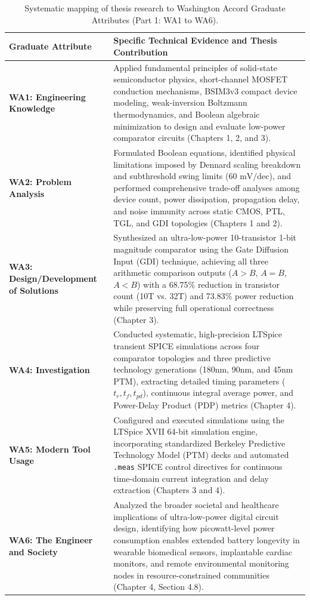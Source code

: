 \documentclass[12pt,a4paper,oneside]{report}
\begin{document}
\begin{table}[p]
\centering
\singlespacing
\small
\renewcommand{\arraystretch}{1.25}
\caption{Systematic mapping of thesis research to Washington Accord Graduate Attributes (Part 1: WA1 to WA6).}
\label{tab:wa_mapping}
\vspace{0.25cm}
\begin{tabular}{|>{\raggedright\arraybackslash}p{3.6cm}|>{\raggedright\arraybackslash}p{10.0cm}|}
\hline
\textbf{Graduate Attribute} & \textbf{Specific Technical Evidence and Thesis Contribution} \\
\hline
\textbf{WA1: Engineering Knowledge} & Applied fundamental principles of solid-state semiconductor physics, short-channel MOSFET conduction mechanisms, BSIM3v3 compact device modeling, weak-inversion Boltzmann thermodynamics, and Boolean algebraic minimization to design and evaluate low-power comparator circuits (Chapters 1, 2, and 3). \\
\hline
\textbf{WA2: Problem Analysis} & Formulated Boolean equations, identified physical limitations imposed by Dennard scaling breakdown and subthreshold swing limits ($60\text{ mV/dec}$), and performed comprehensive trade-off analyses among device count, power dissipation, propagation delay, and noise immunity across static CMOS, PTL, TGL, and GDI topologies (Chapters 1 and 2). \\
\hline
\textbf{WA3: Design/Development of Solutions} & Synthesized an ultra-low-power 10-transistor 1-bit magnitude comparator using the Gate Diffusion Input (GDI) technique, achieving all three arithmetic comparison outputs ($A>B$, $A=B$, $A<B$) with a 68.75\% reduction in transistor count (10T vs. 32T) and 73.83\% power reduction while preserving full operational correctness (Chapter 3). \\
\hline
\textbf{WA4: Investigation} & Conducted systematic, high-precision LTSpice transient SPICE simulations across four comparator topologies and three predictive technology generations (180nm, 90nm, and 45nm PTM), extracting detailed timing parameters ($t_r, t_f, t_{pd}$), continuous integral average power, and Power-Delay Product (PDP) metrics (Chapter 4). \\
\hline
\textbf{WA5: Modern Tool Usage} & Configured and executed simulations using the LTSpice XVII 64-bit simulation engine, incorporating standardized Berkeley Predictive Technology Model (PTM) decks and automated \texttt{.meas} SPICE control directives for continuous time-domain current integration and delay extraction (Chapters 3 and 4). \\
\hline
\textbf{WA6: The Engineer and Society} & Analyzed the broader societal and healthcare implications of ultra-low-power digital circuit design, identifying how picowatt-level power consumption enables extended battery longevity in wearable biomedical sensors, implantable cardiac monitors, and remote environmental monitoring nodes in resource-constrained communities (Chapter 4, Section 4.8). \\
\hline
\end{tabular}
\end{table}
\end{document}
